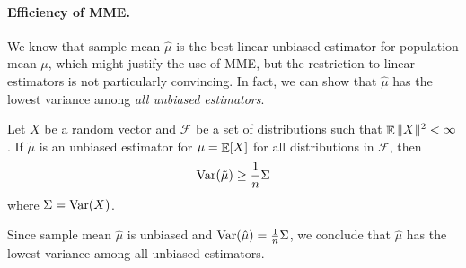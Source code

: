 \documentclass[10pt]{article}
\begin{document}
\paragraph{Efficiency of MME.} We know that sample mean $\hat{\mu}$ is the best linear unbiased estimator for population mean $\mu$, which might justify the use of MME, but the restriction to linear estimators is not particularly convincing. In fact, we can show that $\hat{\mu}$ has the lowest variance among \emph{all unbiased estimators}.

\begin{theorem}
	Let $X$ be a random vector and $\mathcal{F}$ be a set of distributions such that $\mathop{\mathbb{E}} \|X\|^2 < \infty$. If $\tilde{\mu}$ is an unbiased estimator for $\mu = \mathop{\mathbb{E}}[X]$ for all distributions in $\mathcal{F}$, then
	\[
	\mathop{\rm Var}(\tilde{\mu}) \ge \frac{1}{n}\Sigma
	\]
	where $\Sigma = \mathop{\rm Var}(X)$.
\end{theorem}
\begin{remark}
	Since sample mean $\hat{\mu}$ is unbiased and $\mathop{\rm Var}(\hat{\mu}) = \frac{1}{n}\Sigma$, we conclude that $\hat{\mu}$ has the lowest variance among all unbiased estimators.
\end{remark}
\end{document}
